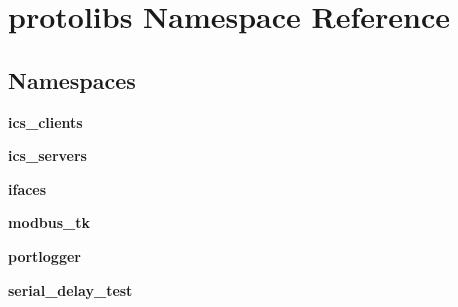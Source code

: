 \section{protolibs Namespace Reference}
\label{namespaceprotolibs}
\subsection*{Namespaces}
\begin{DoxyCompactItemize}
\item 
 {\bf ics\+\_\+clients}
\item 
 {\bf ics\+\_\+servers}
\item 
 {\bf ifaces}
\item 
 {\bf modbus\+\_\+tk}
\item 
 {\bf portlogger}
\item 
 {\bf serial\+\_\+delay\+\_\+test}
\end{DoxyCompactItemize}
